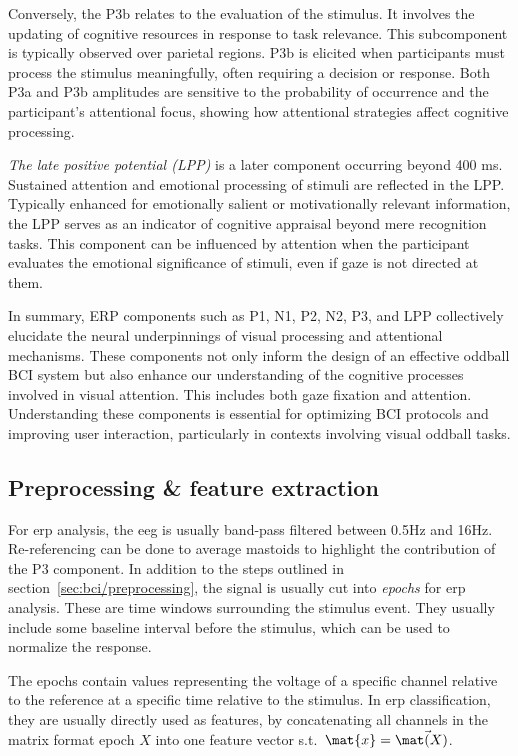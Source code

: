 Conversely, the P3b relates to the evaluation of the stimulus.
It involves the updating of cognitive resources in response to task relevance.
This subcomponent is typically observed over parietal regions.
P3b is elicited when participants must process the stimulus meaningfully,
often requiring a decision or response.
Both P3a and P3b amplitudes are sensitive to the probability of occurrence
and the participant's attentional focus, showing how attentional strategies
affect cognitive processing.

\emph{The late positive potential (LPP)} is a later component occurring beyond 400 ms.
Sustained attention and emotional processing of stimuli are reflected in the
LPP.
Typically enhanced for emotionally salient or motivationally relevant
information, the LPP serves as an indicator of cognitive appraisal beyond mere
recognition tasks.
This component can be influenced by attention when the participant evaluates
the emotional significance of stimuli, even if gaze is not directed at them.

In summary, ERP components such as P1, N1, P2, N2, P3, and LPP collectively
elucidate the neural underpinnings of visual processing and attentional
mechanisms.
These components not only inform the design of an effective oddball BCI system
but also enhance our understanding of the cognitive processes involved in visual
attention.
This includes both gaze fixation and attention.
Understanding these components is essential for optimizing BCI protocols and
improving user interaction, particularly in contexts involving visual oddball
tasks.

\subsection{Preprocessing \& feature extraction}
For \ac{erp} analysis, the \ac{eeg} is usually band-pass filtered between 0.5Hz
and 16Hz.
Re-referencing can be done to average mastoids to highlight the contribution of
the P3 component.
In addition to the steps outlined in section~\ref{sec:bci/preprocessing},
the signal is usually cut into \emph{epochs} for \ac{erp} analysis.
These are time windows surrounding the stimulus event.
They usually include some baseline interval before the stimulus, which can be
used to normalize the response.

The epochs contain values representing the voltage of a specific channel relative to the
reference at a specific time relative to the stimulus.
In \ac{erp} classification, they are usually directly used as features, by
concatenating all channels in the matrix format epoch $X$ into one feature
vector s.t.\ $\mat{x} = \mat\vec(X)$.

